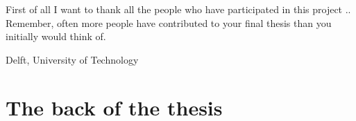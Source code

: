 \documentclass[a4paper,11pt]{mscThesis}
\begin{document}
    \printnomenclature
    \cleardoublepage
%
%
%
\mainmatter
%
\cleardoublepage

%
		
    	
    	
    	
    	
    	
    	

    First of all I want to thank all the people who have participated in this project ..
    Remember, often more people have contributed to your final thesis than you initially would think of.
    \vspace*{15mm}

    \noindent
    Delft, University of Technology \hfill \mscname\\ %
    \mscdate


%
    


\appendix

    \chapter{The back of the thesis}
\end{document}
